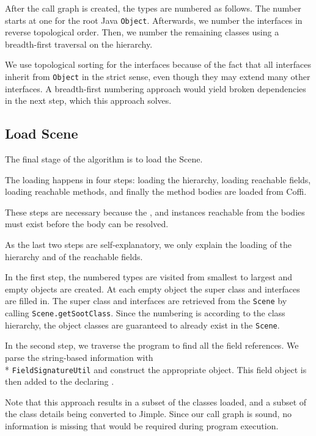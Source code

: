 \documentclass{sigplanconf}
\begin{document}
After the call graph is created, the types are numbered as follows. The number starts at one for the root Java {\tt Object}. Afterwards, we number the interfaces in reverse topological order. Then, we number the remaining classes using a breadth-first traversal on the hierarchy.

We use topological sorting for the interfaces because of the fact that all interfaces inherit from {\tt Object} in the strict sense, even though they may extend many other interfaces. A breadth-first numbering approach would yield broken dependencies in the next step, which this approach solves. 

\subsection{Load Scene}
\label{sec:loadscene}
The final stage of the algorithm is to load the Scene. 

The loading happens in four steps: loading the hierarchy, loading reachable fields, loading reachable methods, and finally the method bodies are loaded from Coffi.

These steps are necessary because the \sootclass, \sootfield and \sootmethod instances reachable from the bodies must exist before the body can be resolved.

As the last two steps are self-explanatory, we only explain the loading of the hierarchy and of the reachable fields.

In the first step, the numbered types are visited from smallest to largest and empty \sootclass objects are created. At each empty \sootclass object the super class and interfaces are filled in. The super class and interfaces are retrieved from the {\tt Scene} by calling {\tt Scene.getSootClass}. Since the numbering is according to the class hierarchy, the object classes are guaranteed to already exist in the {\tt Scene}.

In the second step, we traverse the program to find all the field references. We parse the string-based information with \\*
{\tt FieldSignatureUtil} and construct the appropriate \sootfield object. This field object is then added to the declaring \sootclass.


Note that this approach results in a subset of the classes loaded, and a subset of the class details being converted to Jimple. Since our call graph is sound, no information is missing that would be required during program execution.
\end{document}
